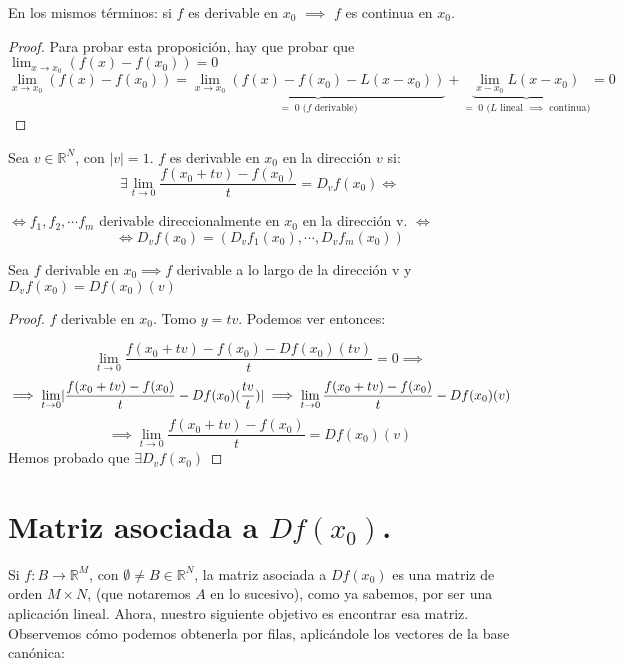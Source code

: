 \begin{nprop} En los mismos términos: si $f$ es derivable en $x_0$ $\implies$ $f$ es continua en $x_0$.

\end{nprop}

\begin{proof} Para probar esta proposición, hay que probar que $\lim_{x\to x_0} (f(x)-f(x_0)) = 0$
\[
	\lim_{x\to x_0} (f(x)-f(x_0)) = \underbrace{\lim_{x\to x_0} (f(x)-f(x_0)-L(x-x_0))}_{=\;0 \text{ ($f$ derivable)}} + \underbrace{\lim_{x-x_0} L(x-x_0)}_{=\; 0 \text{ ($L$ lineal $\implies$ continua)}} = 0
\]
\end{proof}

\begin{ndef}
	Sea $v\in \mathbb{R}^N$, con $|v| = 1$. $f$ es derivable en $x_0$ en la dirección $v$ si:
	\[
		\exists \lim_{t\to 0} \frac{f(x_0+tv)-f(x_0)}{t} = D_v f(x_0) \iff
	\]

	\begin{center}
	$\iff f_1,f_2,\cdots f_m$ derivable direccionalmente en $x_0$ en la dirección v. $\iff$
	\[
	\iff D_vf(x_0) = (D_vf_1(x_0),\cdots,D_vf_m(x_0))
	\]
\end{center}
\end{ndef}


\begin{nprop}
	Sea $f$ derivable en $x_0\implies f$ derivable a lo largo de la dirección v y $D_vf(x_0) = Df(x_0)(v)$
	\begin{proof}
	$f$ derivable en $x_0$. Tomo $y=tv  $. Podemos ver entonces:

	\[
	\lim_{t \to 0} \frac{f(x_0 +tv) - f(x_0) - Df(x_0)(tv)}{t} = 0 \implies
	\]
	\[
	\implies \lim_{t \to 0} \lvert\frac{f(x_0 +tv) - f(x_0)}{t} - Df(x_0)(\frac{tv}{t})\rvert \implies \lim_{t \to 0}\frac{f(x_0 +tv) -f(x_0)}{t} - Df(x_0)(v)
	\]
	\[
	\implies \lim_{t \to 0}\frac{f(x_0 +tv) - f(x_0)}{t} = Df(x_0)(v)
	\]
Hemos probado que $\exists D_vf(x_0)$
\end{proof}
\end{nprop}


\section{Matriz asociada a $Df(x_0)$.}
	Si $f : B \longrightarrow \mathbb{R}^M$, con $\emptyset \ne B \in \mathbb{R}^N$, la matriz asociada a $Df(x_0)$ es una matriz de orden $M \times N$, (que notaremos $A$ en lo sucesivo), como ya sabemos, por ser una aplicación lineal. Ahora, nuestro siguiente objetivo es encontrar esa matriz. Observemos cómo podemos obtenerla por filas, aplicándole los vectores de la base canónica:

